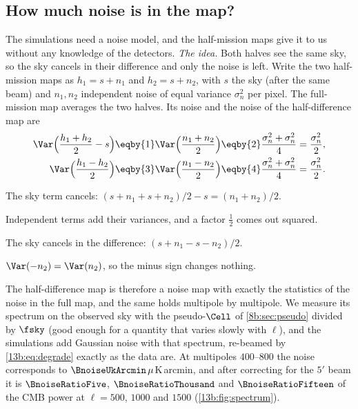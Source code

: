 \subsection{How much noise is in the map?}
\label{13b:sec:noise}

The simulations need a noise model, and the half-mission maps give it to us without any knowledge of the
detectors. \emph{The idea.} Both halves see the same sky, so the sky cancels in their difference and only the
noise is left. Write the two half-mission maps as $h_1=s+n_1$ and $h_2=s+n_2$, with $s$ the sky (after the
same beam) and $n_1,n_2$ independent noise of equal variance $\sigma_n^2$ per pixel. The full-mission map averages
the two halves. Its noise and the noise of the half-difference map are
\begin{align}
  \Var\Bigl(\frac{h_1+h_2}{2}-s\Bigr)
  &\eqby{1}\Var\Bigl(\frac{n_1+n_2}{2}\Bigr)
   \eqby{2}\frac{\sigma_n^2+\sigma_n^2}{4}=\frac{\sigma_n^2}{2},
  \nonumber\\
  \Var\Bigl(\frac{h_1-h_2}{2}\Bigr)
  &\eqby{3}\Var\Bigl(\frac{n_1-n_2}{2}\Bigr)
   \eqby{4}\frac{\sigma_n^2+\sigma_n^2}{4}=\frac{\sigma_n^2}{2}.
  \label{13b:eq:hmhd}
\end{align}
\begin{explain}
  \item The sky term cancels: $(s+n_1+s+n_2)/2-s=(n_1+n_2)/2$.
  \item Independent terms add their variances, and a factor $\frac12$ comes out squared.
  \item The sky cancels in the difference: $(s+n_1-s-n_2)/2$.
  \item $\Var(-n_2)=\Var(n_2)$, so the minus sign changes nothing.
\end{explain}
The half-difference map is therefore a noise map with exactly the statistics of the noise in the full map, and
the same holds multipole by multipole. We measure its spectrum on the observed sky with the pseudo-$\Cell$ of
\cref{8b:sec:pseudo} divided by $\fsky$ (good enough for a quantity that varies slowly with $\ell$), and the
simulations add Gaussian noise with that spectrum, re-beamed by \eqref{13b:eq:degrade} exactly as the data are.
At multipoles $400$--$800$ the noise corresponds to $\BnoiseUkArcmin\,\mu$K\,arcmin, and after correcting for the
$5'$ beam it is $\BnoiseRatioFive$, $\BnoiseRatioThousand$ and $\BnoiseRatioFifteen$ of the CMB power at
$\ell=500$, $1000$ and $1500$ (\cref{13b:fig:spectrum}).

